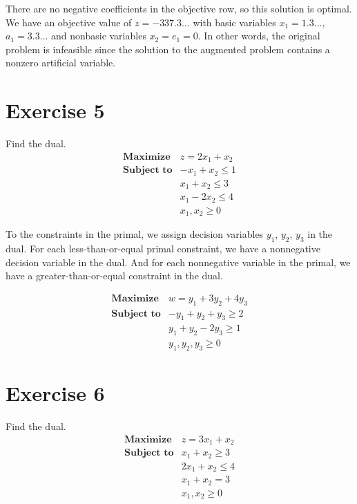 \documentclass[12pt]{article}
\newenvironment{problem}
    {\begin{lrbox}{\mybox}\begin{minipage}{0.98\textwidth}}
    {\end{minipage}\end{lrbox}\begin{center}\framebox[\textwidth]{\usebox{\mybox}}\end{center}}
\theoremstyle{definition}
\begin{document}
There are no negative coefficients in the objective row, so this solution is optimal. We have an objective value of $z = -337.3\dots$ with basic variables $x_1 = 1.3\dots$, $a_1 = 3.3\dots$ and nonbasic variables $x_2 = e_1 = 0$. In other words, the original problem is infeasible since the solution to the augmented problem contains a nonzero artificial variable.

\newpage
\section*{Exercise 5}
\begin{problem}
    Find the dual.
    \[
        \begin{array}{ll}
            \textbf{Maximize} & z = 2x_1 + x_2 \\
            \textbf{Subject to} & -x_1 + x_2 \leq 1 \\
                & x_1 + x_2 \leq 3 \\
                & x_1 - 2x_2 \leq 4 \\
                & x_1, x_2 \geq 0
        \end{array}
    \]
\end{problem}

To the constraints in the primal, we assign decision variables $y_1$, $y_2$, $y_3$ in the dual. For each less-than-or-equal primal constraint, we have a nonnegative decision variable in the dual. And for each nonnegative variable in the primal, we have a greater-than-or-equal constraint in the dual.

\[
    \begin{array}{ll}
        \textbf{Maximize} & w = y_1 + 3y_2 + 4y_3 \\
        \textbf{Subject to} & -y_1 + y_2 + y_3 \geq 2 \\
            & y_1 + y_2 - 2y_3 \geq 1 \\
            & y_1, y_2, y_3 \geq 0
    \end{array}
\]

\section*{Exercise 6}
\begin{problem}
    Find the dual.
    \[
        \begin{array}{ll}
            \textbf{Maximize} & z = 3x_1 + x_2 \\
            \textbf{Subject to} & x_1 + x_2 \geq 3 \\
                & 2x_1 + x_2 \leq 4 \\
                & x_1 + x_2 = 3 \\
                & x_1, x_2 \geq 0
        \end{array}
    \]
\end{problem}
\end{document}
